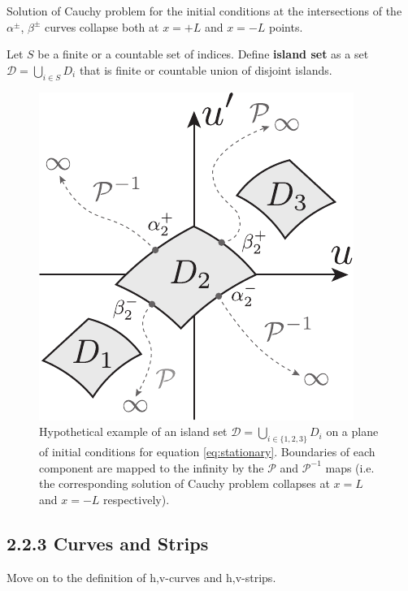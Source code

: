 \begin{remark}
	Solution of Cauchy problem for the initial conditions at the  intersections of the $\alpha^{\pm}$, $\beta^{\pm}$ curves collapse both at $x = +L$ and $x = -L$ points.
\end{remark}

\begin{definition}
	Let $S$ be a finite or a countable set of indices.
	Define {\bf island set} as a set $\mathcal{D} = \bigcup_{i \in S} D_i$ that is finite or countable union of disjoint islands.
\label{def:island-set}
\end{definition}

\begin{figure}[h]
\centering
	\includegraphics[scale = 1]{pic/island set}
	\caption{Hypothetical example of an island set $\mathcal{D} = \bigcup_{i \in \{1, 2, 3\}} D_i$ on a plane of initial conditions for equation \eqref{eq:stationary}. Boundaries of each component are mapped to the infinity by the $\mathcal{P}$ and $\mathcal{P}^{-1}$ maps (i.e. the corresponding solution of Cauchy problem collapses at $x = L$ and $x = -L$ respectively).}
\label{fig:islands-set}
\end{figure}

\subsection*{2.2.3 Curves and Strips}

Move on to the definition of h,v-curves and h,v-strips.

